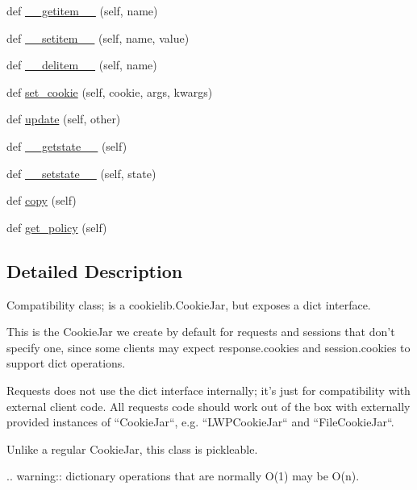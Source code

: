 \begin{DoxyCompactItemize}
\item 
def \hyperlink{classpip_1_1__vendor_1_1requests_1_1cookies_1_1RequestsCookieJar_a7f155bac4dba71395ace24b60f24c2b4}{\+\_\+\+\_\+getitem\+\_\+\+\_\+} (self, name)
\item 
def \hyperlink{classpip_1_1__vendor_1_1requests_1_1cookies_1_1RequestsCookieJar_aa3ae937fbc242ed0018f8da038f73363}{\+\_\+\+\_\+setitem\+\_\+\+\_\+} (self, name, value)
\item 
def \hyperlink{classpip_1_1__vendor_1_1requests_1_1cookies_1_1RequestsCookieJar_a4547eef28b96e83cb40919c19a29adb4}{\+\_\+\+\_\+delitem\+\_\+\+\_\+} (self, name)
\item 
def \hyperlink{classpip_1_1__vendor_1_1requests_1_1cookies_1_1RequestsCookieJar_ab4c48d452c9788d13587e437966d17af}{set\+\_\+cookie} (self, cookie, args, kwargs)
\item 
def \hyperlink{classpip_1_1__vendor_1_1requests_1_1cookies_1_1RequestsCookieJar_acd672e26f44f92529802c10e4211eee2}{update} (self, other)
\item 
def \hyperlink{classpip_1_1__vendor_1_1requests_1_1cookies_1_1RequestsCookieJar_aa819dc3a7e6c275bcd1aabfaea9ca47a}{\+\_\+\+\_\+getstate\+\_\+\+\_\+} (self)
\item 
def \hyperlink{classpip_1_1__vendor_1_1requests_1_1cookies_1_1RequestsCookieJar_afaa8e6aa89f85c83ec18b218e6520eac}{\+\_\+\+\_\+setstate\+\_\+\+\_\+} (self, state)
\item 
def \hyperlink{classpip_1_1__vendor_1_1requests_1_1cookies_1_1RequestsCookieJar_a801ff4488eff857bc42bd3bf58972ad3}{copy} (self)
\item 
def \hyperlink{classpip_1_1__vendor_1_1requests_1_1cookies_1_1RequestsCookieJar_ad3917887bdfcc30114600741f7c0208c}{get\+\_\+policy} (self)
\end{DoxyCompactItemize}


\subsection{Detailed Description}
\begin{DoxyVerb}Compatibility class; is a cookielib.CookieJar, but exposes a dict
interface.

This is the CookieJar we create by default for requests and sessions that
don't specify one, since some clients may expect response.cookies and
session.cookies to support dict operations.

Requests does not use the dict interface internally; it's just for
compatibility with external client code. All requests code should work
out of the box with externally provided instances of ``CookieJar``, e.g.
``LWPCookieJar`` and ``FileCookieJar``.

Unlike a regular CookieJar, this class is pickleable.

.. warning:: dictionary operations that are normally O(1) may be O(n).
\end{DoxyVerb}
 

